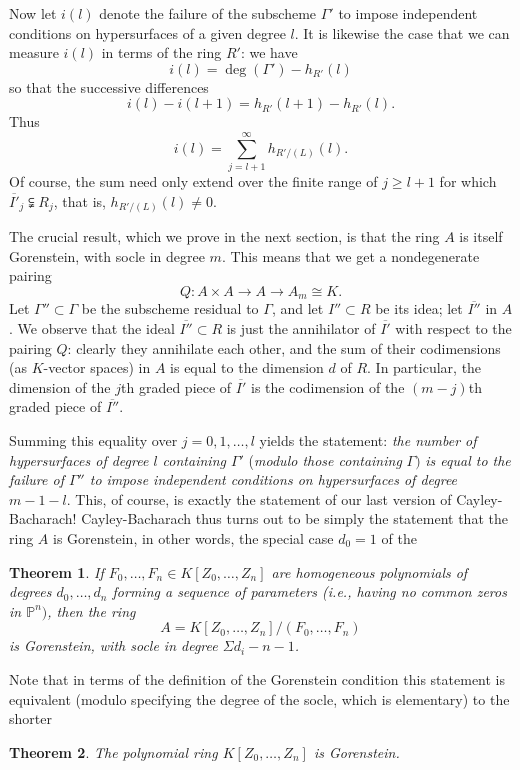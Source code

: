 \documentclass{bull-l}
\theoremstyle{pplain}
\newtheorem{thmcb}{Theorem}
\theoremstyle{definition}
\begin{document}
Now let $i(l)$ denote the failure of the subscheme $\Gamma'$ to impose
independent conditions on hypersurfaces of a given degree $l$.  It is likewise
the case that we can measure $i(l)$ in terms of the ring $R'$: we have
\[i(l)=\deg (\Gamma')-h_{R'}(l)\]
so that the successive differences
\[i(l)-i(l+1)=h_{R'}(l+1)-h_{R'}(l).\]
Thus
\[i(l)=\sum^\infty_{j=l+1}h_{R'/(L)}(l).\]
Of course, the sum need only extend over the finite range of $j\ge l+1$ for
which $\overline{I'}_j\subsetneqq R_j$, that is, $h_{R'/(L)}(l)\ne 0$.  

The crucial result, which we prove in the next section, is that the ring $A$ is
itself Gorenstein, with socle in degree $m$.  This means that we get a
nondegenerate pairing
\[Q:A\times A\to A\to A_m\cong K.\]
Let $\Gamma''\subset \Gamma$ be the subscheme residual to $\Gamma$, and let
$I''\subset R$ be its idea; let $\overline{I''}$ in $A$.  We observe that the
ideal $\overline{I''}\subset R$ is just the annihilator of $\overline{I'}$ with
respect to the pairing $Q$: clearly they annihilate each other, and the sum of
their codimensions (as $K$-vector spaces) in $A$ is equal to the dimension $d$
of $R$.  In particular, the dimension of the $j$th graded piece of
$\overline{I'}$ is the codimension of the $(m-j)$th graded piece of
$\overline{I''}$.

Summing this equality over $j=0,1,\dots,l$ yields the statement: \emph{the
number of hypersurfaces of degree $l$ containing $\Gamma'$} (\emph{modulo those
containing} $\Gamma)$ \emph{is equal to the failure of $\Gamma''$ to impose
independent conditions on hypersurfaces of degree} $m-1-l$.  This, of course,
is exactly the statement of our last version of Cayley-Bacharach! 
Cayley-Bacharach thus turns out to be simply the statement that the ring $A$ is
Gorenstein, in other words, the special case $d_0=1$ of the 

\begin{thmcb} \label{thmcb8}
If $F_0,\dots,F_n\in K[Z_0,\dots,Z_n]$ are homogeneous polynomials of degrees
$d_0,\dots,d_n$ forming a sequence of parameters \textup{(}i.e., having no
common zeros in $\mathbb{P}^n)$, then the ring
\[A=K[Z_0,\dots,Z_n]/(F_0,\dots,F_n)\]
is Gorenstein, with socle in degree $\Sigma d_i-n-1$.
\end{thmcb}

Note that in terms of the definition of the Gorenstein condition this statement
is equivalent (modulo specifying the degree of the socle, which is elementary)
to the shorter

\begin{thmcb} \label{thmcb9}
The polynomial ring $K[Z_0,\dots,Z_n]$ is Gorenstein.
\end{thmcb}
\end{document}
